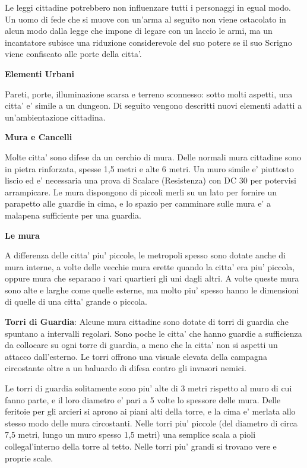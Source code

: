 \documentclass[a4paper,11pt,twoside,openany]{dndbook}
\begin{document}
Le leggi cittadine potrebbero non influenzare tutti i personaggi in egual modo. Un uomo di fede che si muove con un'arma al seguito non viene ostacolato in alcun modo dalla legge che impone di legare con un laccio le armi, ma un incantatore subisce una riduzione considerevole del suo potere se il suo Scrigno viene confiscato alle porte della citta'.

\textbf{Elementi Urbani}

Pareti, porte, illuminazione scarsa e terreno sconnesso: sotto molti aspetti, una citta' e' simile a un dungeon. Di seguito vengono descritti nuovi elementi adatti a un'ambientazione cittadina.

\textbf{Mura e Cancelli}

Molte citta' sono difese da un cerchio di mura. Delle normali mura cittadine sono in pietra rinforzata, spesse 1,5 metri e alte 6 metri. Un muro simile e' piuttosto liscio ed e' necessaria una prova di Scalare (Resistenza) con DC 30 per potervisi arrampicare. Le mura dispongono di piccoli merli su un lato per fornire un parapetto alle guardie in cima, e lo spazio per camminare sulle mura e' a malapena sufficiente per una guardia.

\textbf{Le mura}

A differenza delle citta' piu' piccole, le metropoli spesso sono dotate anche di mura interne, a volte delle vecchie mura erette quando la citta' era piu' piccola, oppure mura che separano i vari quartieri gli uni dagli altri. A volte queste mura sono alte e larghe come quelle esterne, ma molto piu' spesso hanno le dimensioni di quelle di una citta' grande o piccola.

\textbf{Torri di Guardia}: Alcune mura cittadine sono dotate di torri di guardia che spuntano a intervalli regolari. Sono poche le citta' che hanno guardie a sufficienza da collocare su ogni torre di guardia, a meno che la citta' non si aspetti un attacco dall'esterno. Le torri offrono una visuale elevata della campagna circostante oltre a un baluardo di difesa contro gli invasori nemici.

Le torri di guardia solitamente sono piu' alte di 3 metri rispetto al muro di cui fanno parte, e il loro diametro e' pari a 5 volte lo spessore delle mura. Delle feritoie per gli arcieri si aprono ai piani alti della torre, e la cima e' merlata allo stesso modo delle mura circostanti. Nelle torri piu' piccole (del diametro di circa 7,5 metri, lungo un muro spesso 1,5 metri) una semplice scala a pioli collegal'interno della torre al tetto. Nelle torri piu' grandi si trovano vere e proprie scale.
\end{document}
